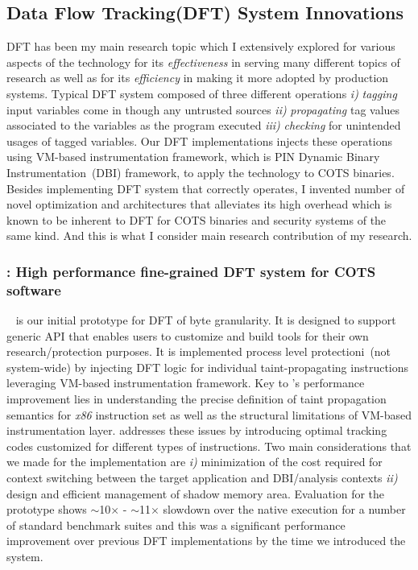 \documentclass[letterpaper, 10pt]{article}
\begin{document}
\begin{small}
\subsection*{Data Flow Tracking(DFT) System Innovations}
%
DFT has been my main research topic which I extensively explored for various
aspects of the technology for its {\it effectiveness} in serving many different
topics of research as well as for its {\it efficiency} in making it more
adopted by production systems.
%
Typical DFT system composed of three different operations {\it i)} {\it
tagging} input variables come in though any untrusted sources {\it ii)} {\it
propagating} tag values associated to the variables as the program executed
{\it iii)} {\it checking} for unintended usages of tagged variables. Our DFT
implementations injects these operations using VM-based instrumentation
framework, which is PIN Dynamic Binary Instrumentation~(DBI) framework, to
apply the technology to COTS binaries.
%
Besides implementing DFT system that correctly operates, I invented number of
novel optimization and architectures that alleviates its high overhead which is
known to be inherent to DFT for COTS binaries and security systems of the same
kind. And this is what I consider main research contribution of my research.

\subsubsection*{\libdft: High performance fine-grained DFT system for COTS
software}

\libdft~\cite{libdft:2012vee} is our initial prototype for DFT of byte
granularity.
%
It is designed to support generic API that enables users to customize and build
tools for their own research/protection purposes.
%
It is implemented process level protectioni~(not system-wide) by injecting DFT
logic for individual taint-propagating instructions leveraging VM-based
instrumentation framework.
%
Key to \libdft's performance improvement lies in understanding the precise
definition of taint propagation semantics for {\it x86} instruction set as well
as the structural limitations of VM-based instrumentation layer. \libdft
addresses these issues by introducing optimal tracking codes customized for
different types of instructions. Two main considerations that we made for the
implementation are {\it i)} minimization of the cost required for context
switching between the target application and DBI/analysis contexts {\it ii)}
design and efficient management of shadow memory area.
%
%
Evaluation for the prototype shows $\sim$10$\times$ - $\sim$11$\times$ slowdown
over the native execution for a number of standard benchmark suites and this
was a significant performance improvement over previous DFT implementations by
the time we introduced the system.


\end{small}
\end{document}
